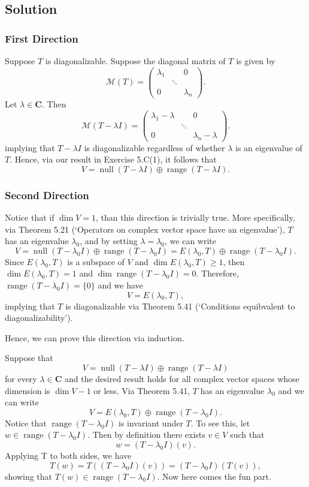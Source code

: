 \documentclass{article}
\begin{document}
\subsection*{Solution}
\subsubsection*{First Direction}
Suppose $T$ is diagonalizable. 
Suppose the diagonal matrix of $T$ is given by
\[\mathcal{M}(T)=\begin{pmatrix}\lambda_1 & & 0\\ & \ddots & \\0 & & \lambda_n\end{pmatrix}.\]
Let $\lambda\in\mathbf{C}$. Then
\[\mathcal{M}(T-\lambda I)=\begin{pmatrix}\lambda_1-\lambda & & 0\\ & \ddots & \\0 & & \lambda_n-\lambda\end{pmatrix}.\]
implying that $T-\lambda I$ is diagonalizable regardless of whether $\lambda$ is an eigenvalue of $T$.
Hence, via our result in Exercise 5.C(1), it follows that 
\[V=\operatorname{null}(T-\lambda I)\oplus\operatorname{range}(T-\lambda I).\] 

\subsubsection*{Second Direction}
Notice that if $\dim V=1$, than this direction is trivially true. 
More specifically, via Theorem 5.21 (`Operators on complex vector space have an eigenvalue'), $T$ has an eigenvalue $\lambda_0$, and by setting $\lambda=\lambda_0$, we can write
\[V=\operatorname{null}(T-\lambda_0 I)\oplus\operatorname{range}(T-\lambda_0I)=E(\lambda_0,T)\oplus \operatorname{range}(T-\lambda_0I).\]
Since $E(\lambda_0,T)$ is a subspace of $V$ and $\operatorname{dim}E(\lambda_0,T)\geq 1$, then $\operatorname{dim}E(\lambda_0,T)=1$ and $\dim \operatorname{range}(T-\lambda_0I)=0$. 
Therefore, $\operatorname{range}(T-\lambda_0I)=\{0\}$ and we have
\[V=E(\lambda_0,T),\]
implying that $T$ is diagonalizable via Theorem 5.41 (`Conditions equibvalent to diagonalizability').

Hence, we can prove this direction via induction. 

Suppose that 
\[V=\operatorname{null}(T-\lambda I)\oplus\operatorname{range}(T-\lambda I)\]
for every $\lambda\in\mathbf{C}$ and the desired result holds for all complex vector spaces whose dimension is $\dim V-1$ or less. 
Via Theorem 5.41, $T$ has an eigenvalue $\lambda_0$ and we can write
\[V=E(\lambda_0,T)\oplus \operatorname{range}(T-\lambda_0 I).\]
Notice that $\operatorname{range}(T-\lambda_0 I)$ is invariant under $T$. 
To see this, let\newline $w\in \operatorname{range}(T-\lambda_0 I)$. 
Then by definition there exists $v\in V$ such that
\[w=(T-\lambda_0 I)(v).\]
Applying T to both sides, we have
\[T(w)=T((T-\lambda_0 I)(v))=(T-\lambda_0 I)(T(v)),\]
showing that $T(w)\in \operatorname{range}(T-\lambda_0 I)$. 
Now here comes the fun part. 
\end{document}
